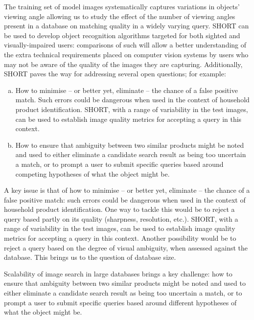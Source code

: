 The training set of model images systematically captures variations in objects' viewing angle allowing us to study the effect of the number of viewing angles present in a database on matching quality in a widely varying query. SHORT can be used to develop object recognition algorithms targeted for both sighted and visually-impaired users: comparisons of such will allow a better understanding of the extra technical requirements placed on computer vision systems by users who may not be aware of the quality of the images they are capturing. Additionally, SHORT paves the way for addressing several open questions; for example:

\begin{enumerate}[a)]
\item How to minimise -- or better yet, eliminate -- the chance of a false positive match. Such errors could be dangerous when used in the context of household product identification. SHORT, with a range of variability in the test images, can be used to establish image quality metrics for accepting a query in this context.

\item How to ensure that ambiguity between two similar products might be noted and used to either eliminate a candidate search result as being too uncertain a match, or to prompt a user to submit specific queries based around competing hypotheses of what the object might be.
\end{enumerate}



A key issue is that of how to minimise -- or better yet, eliminate -- the chance of a false positive match: such errors could be dangerous when used in the context of household product identification. One way to tackle this would be to reject a query based partly on its quality (sharpness, resolution, etc.). SHORT, with a range of variability in the test images, can be used to establish image quality metrics for accepting a query in this context. Another possibility would be to reject a query based on the degree of visual ambiguity, when assessed against the database. This brings us to the question of database size.

Scalability of image search in large databases brings a key challenge: how to ensure that ambiguity between two similar products might be noted and used to either eliminate a candidate search result as being too uncertain a match, or to prompt a user to submit specific queries based around different hypotheses of what the object might be. 

